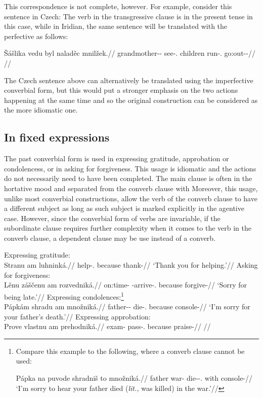 This correspondence is not complete, however. For example, consider this
sentence in Czech:  The verb in the
transgressive clause is in the present tense in this case, while in Iridian, the
same sentence will be translated with the perfective as follows:

\pex
\begingl
\gla \v{S}ášlika vedu byl naladěc mnilžek.//
\glb grandmother-\Dim{}-\Acc{} see-\Cv{}.\Pf{} children run-\Cv{}.\Ipf{} go:out-\Av{}-\Pf{}//
\glft {}//
\endgl
\xe

The Czech sentence above can alternatively be translated using the
imperfective converbial form, but this would put a stronger emphasis on the two
actions happening at the same time and so the original construction can be
considered as the more idiomatic one.

\subsection{In fixed expressions}

The past converbial form is used in expressing gratitude, approbation or
condolencess, or in asking for forgiveness. This usage is idiomatic and the
actions do not necessarily need to have been completed. The main clause is often
in the hortative mood and separated from the converb
clause with  Moreover, this usage, unlike most converbial
constructions, allow the verb of the converb clause to have a different subject
as long as such subject is marked explicitly in the agentive case. However,
since the converbial form of verbs are invariable, if the subordinate clause
requires further complexity when it comes to the verb in the converb clause, a
dependent  clause may be use instead of a converb.

\pex
\a Expressing gratitude:\\
\begingl
\gla Stranu am luhninká.//
\glb help-\Cv{}.\Pf{} because thank-//
\glft `Thank you for helping.'//
\endgl
\a Asking for forgiveness:\\
\begingl
\gla Lěnu záščenu am rozvedniká.//
\glb on:time-\Ins{} \Neg{}-arrive-\Cv{}.\Pf{} because forgive-//
\glft `Sorry for being late.'//
\endgl
\a Expressing condolences:\footnote{Compare this example to the following, where
a converb clause cannot be used:

\ex[lingstyle=fnex,belowexskip=-1em]
\begingl
\gla Pápka na puvode shradniš to množniká.//
\glb father \Loc{} war-\Acc{} die-\Pv{}-\Subj.\Pf{} \Rz{} with console-//
\glft `I'm sorry to hear your father died (\emph{lit.,} was killed) in the war.'//
\endgl\xe}\\
\begingl
\gla Pápkám shradu am množniká.//
\glb father-\Dim{}-\Agt{} die-\Cv{}.\Pf{} because console-//
\glft `I'm sorry for your father's death.'//
\endgl
\a Expressing approbation:\\
\begingl
\gla Prove vlastnu am prehodniká.//
\glb exam-\Acc{} pass-\Cv{}.\Pf{} because praise-//
\glft {}//
\endgl
\xe


